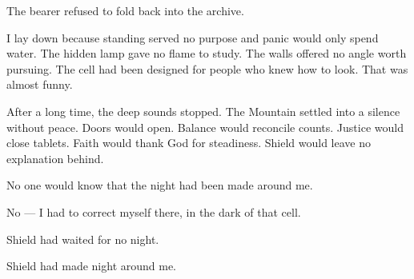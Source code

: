 The bearer refused to fold back into the archive.\par

I lay down because standing served no purpose and panic would only spend water. The hidden lamp gave no flame to study. The walls offered no angle worth pursuing. The cell had been designed for people who knew how to look. That was almost funny.\par

After a long time, the deep sounds stopped. The Mountain settled into a silence without peace. Doors would open. Balance would reconcile counts. Justice would close tablets. Faith would thank God for steadiness. Shield would leave no explanation behind.\par

No one would know that the night had been made around me.\par

No --- I had to correct myself there, in the dark of that cell.\par

Shield had waited for no night.\par

Shield had made night around me.\par

\ornament
